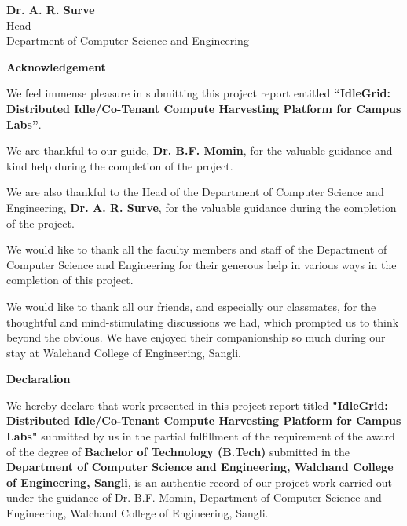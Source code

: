 \documentclass{article}
\begin{document}
\vspace{1.5cm}
\begin{center}
	\textbf{Dr. A. R. Surve}
	\\ Head
	\\ Department of Computer Science and Engineering
\end{center}

	\pagebreak
	
	
	\pagebreak
		\pagebreak
	\begin{center}
	\Huge \textbf {\color {blue}Acknowledgement} \\
	\end{center}
	\vspace{1cm}
	{
	\onehalfspacing
	\setlength{\parindent}{2em}
	\setlength{\parskip}{0.8em}

We feel immense pleasure in submitting this project report entitled \textbf{``IdleGrid: Distributed Idle/Co-Tenant Compute Harvesting Platform for Campus Labs''}.

We are thankful to our guide, \textbf{Dr. B.F. Momin}, for the valuable guidance and kind help during the completion of the project.

We are also thankful to the Head of the Department of Computer Science and Engineering, \textbf{Dr. A. R. Surve}, for the valuable guidance during the completion of the project.

We would like to thank all the faculty members and staff of the Department of Computer Science and Engineering for their generous help in various ways in the completion of this project.

We would like to thank all our friends, and especially our classmates, for the thoughtful and mind-stimulating discussions we had, which prompted us to think beyond the obvious. We have enjoyed their companionship so much during our stay at Walchand College of Engineering, Sangli.

	}
	
	\pagebreak
	\begin{center}
		\Huge \textbf{Declaration} \\
	\end{center}
	\vspace{1cm}
	\par 
	\setlength{\parindent}{8em}
	\doublespacing
	\doublespacing
    \noindent
We hereby declare that work presented in this project report titled 
\textbf {"IdleGrid: Distributed Idle/Co-Tenant Compute Harvesting Platform for Campus Labs"}
 submitted by us in the partial fulfillment of the requirement of the award of the degree of \textbf{Bachelor of Technology (B.Tech)} submitted in the \textbf{Department of Computer Science and Engineering, Walchand College of Engineering, Sangli}, is an authentic record of our project work carried out under the guidance of Dr. B.F. Momin, Department of Computer Science and Engineering, Walchand College of Engineering, Sangli.
	
\end{document}
